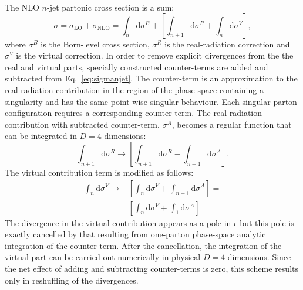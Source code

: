 The NLO $n$-jet partonic cross section is a sum:
\begin{equation}
\sigma = \sigma_\text{LO} + \sigma_\text{NLO} = \int_n{\mathrm{d}\sigma^B} + \left[ \int_{n+1}{\mathrm{d}\sigma^R} + \int_n{\mathrm{d}\sigma^V} \right],
\label{eq:sigmanjet}
\end{equation}
where $\sigma^B$ is the Born-level cross section, $\sigma^R$ is the real-radiation correction and $\sigma^V$ is the virtual correction. In order to remove explicit divergences from the the real and virtual parts, specially constructed counter-terms are added and subtracted from Eq.~\eqref{eq:sigmanjet}. The counter-term is an approximation to the real-radiation contribution in the region of the phase-space containing a singularity and has the same point-wise singular behaviour. Each singular parton configuration requires a corresponding counter term. The real-radiation contribution with subtracted counter-term, $\sigma^A$, becomes a regular function that can be integrated in $D=4$ dimensions:
\begin{equation}
\int_{n+1}{\mathrm{d}\sigma^R} \rightarrow \left[ \int_{n+1}{\mathrm{d}\sigma^R} - \int_{n+1}{\mathrm{d}\sigma^A} \right].
\end{equation}
The virtual contribution term is modified as follows:
\begin{equation}
	\begin{split}
		\int_{n}{\mathrm{d}\sigma^V} \rightarrow& \left[ \int_{n}{\mathrm{d}\sigma^V} + \int_{n+1}{\mathrm{d}\sigma^A} \right] = \\
                                                      & \left[ \int_{n}{\mathrm{d}\sigma^V + \int_{1}{\mathrm{d}\sigma^A}} \right]
	\end{split}
\end{equation}
The divergence in the virtual contribution appears as a pole in $\epsilon$ but this pole is exactly cancelled by that resulting from one-parton phase-space analytic integration of the counter term. After the cancellation, the integration of the virtual part can be carried out numerically in physical $D=4$ dimensions. Since the net effect of adding and subtracting counter-terms is zero, this scheme results only in reshuffling of the divergences.
